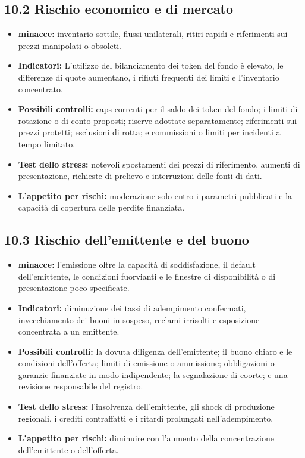 \documentclass[11pt]{article}
\begin{document}
\subsection*{10.2 Rischio economico e di mercato}

\begin{itemize}[leftmargin=*]
\item \textbf{minacce:} inventario sottile, flussi unilaterali, ritiri rapidi e riferimenti sui prezzi manipolati o obsoleti.
\item \textbf{Indicatori:} L'utilizzo del bilanciamento dei token del fondo è elevato, le differenze di quote aumentano, i rifiuti frequenti dei limiti e l'inventario concentrato.
\item \textbf{Possibili controlli:} caps correnti per il saldo dei token del fondo; i limiti di rotazione o di conto proposti; riserve adottate separatamente; riferimenti sui prezzi protetti; esclusioni di rotta; e commissioni o limiti per incidenti a tempo limitato.
\item \textbf{Test dello stress:} notevoli spostamenti dei prezzi di riferimento, aumenti di presentazione, richieste di prelievo e interruzioni delle fonti di dati.
\item \textbf{L'appetito per rischi:} moderazione solo entro i parametri pubblicati e la capacità di copertura delle perdite finanziata.
\end{itemize}
\subsection*{10.3 Rischio dell'emittente e del buono}

\begin{itemize}[leftmargin=*]
\item \textbf{minacce:} l'emissione oltre la capacità di soddisfazione, il default dell'emittente, le condizioni fuorvianti e le finestre di disponibilità o di presentazione poco specificate.
\item \textbf{Indicatori:} diminuzione dei tassi di adempimento confermati, invecchiamento dei buoni in sospeso, reclami irrisolti e esposizione concentrata a un emittente.
\item \textbf{Possibili controlli:} la dovuta diligenza dell'emittente; il buono chiaro e le condizioni dell'offerta; limiti di emissione o ammissione; obbligazioni o garanzie finanziate in modo indipendente; la segnalazione di coorte; e una revisione responsabile del registro.
\item \textbf{Test dello stress:} l'insolvenza dell'emittente, gli shock di produzione regionali, i crediti contraffatti e i ritardi prolungati nell'adempimento.
\item \textbf{L'appetito per rischi:} diminuire con l'aumento della concentrazione dell'emittente o dell'offerta.
\end{itemize}
\end{document}
